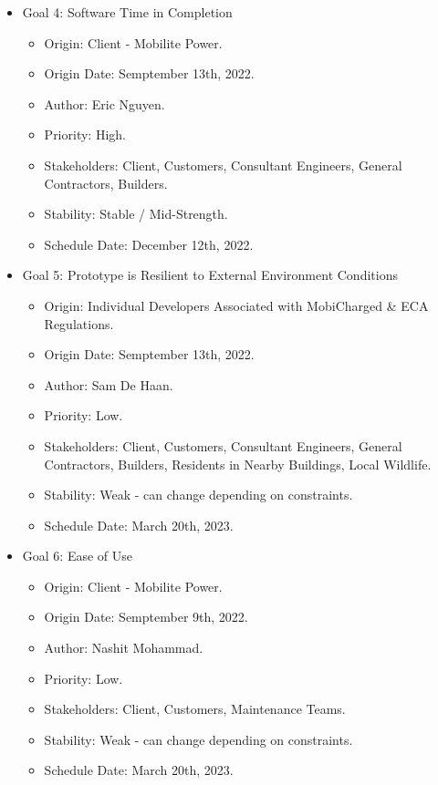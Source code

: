 \documentclass[12pt, titlepage]{article}
\begin{document}
\begin{itemize}
    \item Goal 4: Software Time in Completion
    \begin{itemize}
        \item Origin: Client - Mobilite Power.
        \item Origin Date: Semptember 13th, 2022.
        \item Author: Eric Nguyen.
        \item Priority: High.
        \item Stakeholders: Client, Customers, Consultant Engineers, General Contractors, Builders.
        \item Stability: Stable / Mid-Strength.
        \item Schedule Date: December 12th, 2022.
    \end{itemize}
    \item Goal 5: Prototype is Resilient to External Environment Conditions
    \begin{itemize}
        \item Origin: Individual Developers Associated with MobiCharged \& ECA Regulations.
        \item Origin Date: Semptember 13th, 2022.
        \item Author: Sam De Haan.
        \item Priority: Low.
        \item Stakeholders: Client, Customers, Consultant Engineers, General Contractors, Builders, Residents in Nearby Buildings, Local Wildlife.
        \item Stability: Weak - can change depending on constraints.
        \item Schedule Date: March 20th, 2023.
    \end{itemize}
    \item Goal 6: Ease of Use
    \begin{itemize}
        \item Origin: Client - Mobilite Power.
        \item Origin Date: Semptember 9th, 2022.
        \item Author: Nashit Mohammad.
        \item Priority: Low.
        \item Stakeholders: Client, Customers, Maintenance Teams.
        \item Stability: Weak - can change depending on constraints.
        \item Schedule Date: March 20th, 2023.
    \end{itemize}

\end{itemize}
\end{document}
